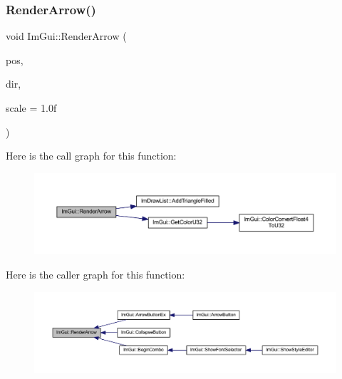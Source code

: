 \subsubsection{\texorpdfstring{Render\+Arrow()}{RenderArrow()}}
{\footnotesize\ttfamily void Im\+Gui\+::\+Render\+Arrow (\begin{DoxyParamCaption}\item[{\mbox{\hyperlink{struct_im_vec2}{Im\+Vec2}}}]{pos,  }\item[{\mbox{\hyperlink{imgui_8h_a874086389bc27cc9647118d22a806403}{Im\+Gui\+Dir}}}]{dir,  }\item[{float}]{scale = {\ttfamily 1.0f} }\end{DoxyParamCaption})}

Here is the call graph for this function\+:
\nopagebreak
\begin{figure}[H]
\begin{center}
\leavevmode
\includegraphics[width=350pt]{namespace_im_gui_a23383180b2870fa1326f5c5394fc03d7_cgraph}
\end{center}
\end{figure}
Here is the caller graph for this function\+:
\nopagebreak
\begin{figure}[H]
\begin{center}
\leavevmode
\includegraphics[width=350pt]{namespace_im_gui_a23383180b2870fa1326f5c5394fc03d7_icgraph}
\end{center}
\end{figure}
\mbox{\label{namespace_im_gui_af1ea568bffa58ec26100de3bf60af5f2}} 
